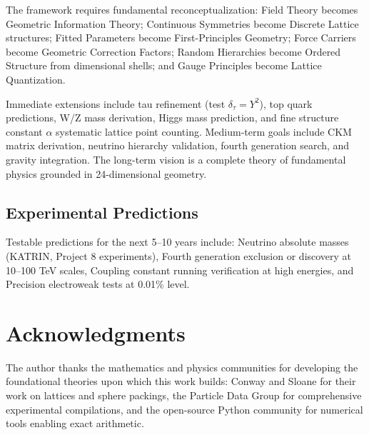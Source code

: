 \documentclass[11pt]{article}
\begin{document}
The framework requires fundamental reconceptualization: Field Theory becomes Geometric Information Theory; Continuous Symmetries become Discrete Lattice structures; Fitted Parameters become First-Principles Geometry; Force Carriers become Geometric Correction Factors; Random Hierarchies become Ordered Structure from dimensional shells; and Gauge Principles become Lattice Quantization.

Immediate extensions include tau refinement (test $\delta_\tau = Y^2$), top quark predictions, W/Z mass derivation, Higgs mass prediction, and fine structure constant $\alpha$ systematic lattice point counting. Medium-term goals include CKM matrix derivation, neutrino hierarchy validation, fourth generation search, and gravity integration. The long-term vision is a complete theory of fundamental physics grounded in 24-dimensional geometry.

\subsection{Experimental Predictions}

Testable predictions for the next 5--10 years include: Neutrino absolute masses (KATRIN, Project 8 experiments), Fourth generation exclusion or discovery at 10--100 TeV scales, Coupling constant running verification at high energies, and Precision electroweak tests at 0.01\% level.

\section*{Acknowledgments}

The author thanks the mathematics and physics communities for developing the foundational theories upon which this work builds: Conway and Sloane for their work on lattices and sphere packings, the Particle Data Group for comprehensive experimental compilations, and the open-source Python community for numerical tools enabling exact arithmetic.



\end{document}
